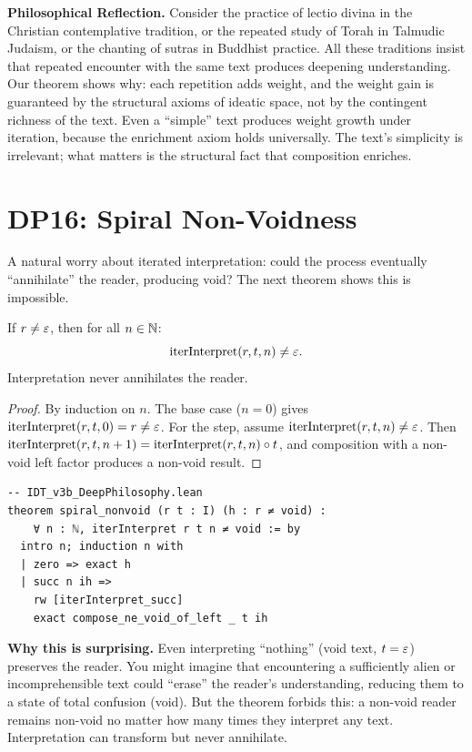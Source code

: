 \begin{reflectionbox}
\textbf{Philosophical Reflection.}
Consider the practice of lectio divina in the Christian contemplative
tradition, or the repeated study of Torah in Talmudic Judaism, or the
chanting of sutras in Buddhist practice. All these traditions insist
that repeated encounter with the same text produces deepening
understanding. Our theorem shows why: each repetition adds weight,
and the weight gain is guaranteed by the structural axioms of ideatic
space, not by the contingent richness of the text. Even a ``simple''
text produces weight growth under iteration, because the enrichment
axiom holds universally. The text's simplicity is irrelevant; what
matters is the structural fact that composition enriches.
\end{reflectionbox}

\section{DP16: Spiral Non-Voidness}

A natural worry about iterated interpretation: could the process
eventually ``annihilate'' the reader, producing void? The next theorem
shows this is impossible.

\begin{theorem}
\label{thm:spiral-nonvoid}
If $r \neq \varepsilon$, then for all $n \in \mathbb{N}$:
\[
\mathrm{iterInterpret}(r, t, n) \neq \varepsilon.
\]
Interpretation never annihilates the reader.
\end{theorem}

\begin{proof}
By induction on $n$. The base case ($n = 0$) gives
$\mathrm{iterInterpret}(r, t, 0) = r \neq \varepsilon$. For the step,
assume $\mathrm{iterInterpret}(r, t, n) \neq \varepsilon$. Then
$\mathrm{iterInterpret}(r, t, n+1) =
\mathrm{iterInterpret}(r, t, n) \circ t$, and composition with a
non-void left factor produces a non-void result.
\end{proof}

\begin{lstlisting}
-- IDT_v3b_DeepPhilosophy.lean
theorem spiral_nonvoid (r t : I) (h : r ≠ void) :
    ∀ n : ℕ, iterInterpret r t n ≠ void := by
  intro n; induction n with
  | zero => exact h
  | succ n ih =>
    rw [iterInterpret_succ]
    exact compose_ne_void_of_left _ t ih
\end{lstlisting}

\begin{surprisebox}
\textbf{Why this is surprising.} Even interpreting ``nothing'' (void
text, $t = \varepsilon$) preserves the reader. You might imagine that
encountering a sufficiently alien or incomprehensible text could
``erase'' the reader's understanding, reducing them to a state of total
confusion (void). But the theorem forbids this: a non-void reader
remains non-void no matter how many times they interpret any text.
Interpretation can transform but never annihilate.
\end{surprisebox}


